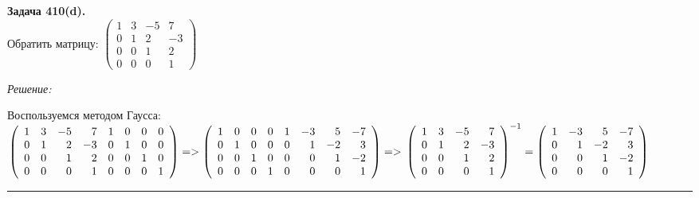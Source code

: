 \documentclass[a4paper, 12pt]{article}
\newenvironment{problem}[2][Задача]
    { \begin{mdframed}[backgroundcolor=gray!10] \textbf{#1 #2.} \\}
    {  \end{mdframed}}
\newenvironment{solution}
    {\textit{Решение: }}
    {\noindent\rule{7in}{1.5pt}}
\begin{document}
\begin{problem}{410(d)}
Обратить матрицу:
$\left(\begin{array}{rrrr}1 & 3 & -5 & 7\\0 & 1 & 2 & -3\\ 0 & 0 & 1 & 2 \\ 0 & 0 & 0 & 1\end{array}\right)$

\end{problem}
\begin{solution}

Воспользуемся методом Гаусса: \\
$
\left(
\begin{array}{rrrrrrrr}
1 & 3 & -5 & 7 & 1 & 0 & 0 & 0 \\
0 & 1 & 2 & -3 & 0 & 1 & 0 & 0 \\
0 & 0 & 1 & 2  & 0 & 0 & 1 & 0 \\
0 & 0 & 0 & 1  & 0 & 0 & 0 & 1
\end{array}
\right)
=>
\left(
\begin{array}{rrrrrrrr}
1 & 0 & 0 & 0 & 1 & -3 & 5 & -7 \\
0 & 1 & 0 & 0 & 0 & 1 & -2 & 3 \\
0 & 0 & 1 & 0  & 0 & 0 & 1 & -2 \\
0 & 0 & 0 & 1  & 0 & 0 & 0 & 1
\end{array}
\right)
=> \\
\left(
\begin{array}{rrrr}
1 & 3 & -5 & 7 \\
0 & 1 & 2 & -3 \\
0 & 0 & 1 & 2 \\
0 & 0 & 0 & 1
\end{array}
\right)^{-1}
=
\left(
\begin{array}{rrrr}
1 & -3 & 5 & -7 \\
0 & 1 & -2 & 3 \\
0 & 0 & 1 & -2 \\
0 & 0 & 0 & 1
\end{array}
\right)
$

\end{solution} 
\end{document}
